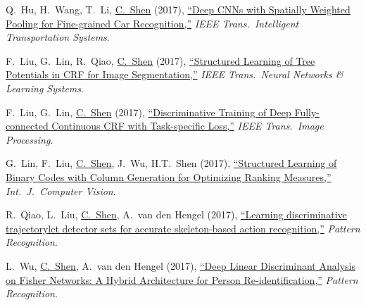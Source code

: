 \documentclass[9pt, a4paper]{article}
\newcommand{\years}[1]{\marginnote{\scriptsize #1}}
\def\highlight{\uline}
\begin{document}
\medskip

\years{2017} Q.~Hu, H.~Wang, T.~Li, \highlight{C.~Shen} (2017),
\href{http://www.google.com/search?lr=&ie=UTF-8&oe=UTF-8&q=Deep+CNNs+with+Spatially+Weighted+Pooling+for+Fine-grained+Car+Recognition+Qichang+Hu%2C+Huibing+Wang%2C+Teng+Li%2C+Chunhua+Shen}{``Deep {CNNs} with Spatially Weighted Pooling for Fine-grained Car Recognition,{}''}
\emph{IEEE Trans.\  Intelligent Transportation Systems}.

\medskip

\years{2017} F.~Liu, G.~Lin, R.~Qiao, \highlight{C.~Shen} (2017),
\href{http://www.google.com/search?lr=&ie=UTF-8&oe=UTF-8&q=Structured+Learning+of+Tree+Potentials+in+CRF+for+Image+Segmentation+Fayao+Liu%2C+Guosheng+Lin%2C+Ruizhi+Qiao%2C+Chunhua+Shen}{``Structured Learning of Tree Potentials in {CRF} for Image Segmentation,{}''}
\emph{IEEE Trans.\  Neural Networks \& Learning Systems}.

\medskip

\years{2017} F.~Liu, G.~Lin, \highlight{C.~Shen} (2017),
\href{http://www.google.com/search?lr=&ie=UTF-8&oe=UTF-8&q=Discriminative+Training+of+Deep+Fully-connected+Continuous+CRF+with+Task-specific+Loss+Fayao+Liu%2C+Guosheng+Lin%2C+Chunhua+Shen}{``Discriminative Training of Deep Fully-connected Continuous {CRF} with Task-specific Loss,{}''}
\emph{IEEE Trans.\  Image Processing}.

\medskip

\years{2017} G.~Lin, F.~Liu, \highlight{C.~Shen}, J.~Wu, H.T.~Shen (2017),
\href{http://www.google.com/search?lr=&ie=UTF-8&oe=UTF-8&q=Structured+Learning+of+Binary+Codes+with+Column+Generation+for+Optimizing+Ranking+Measures+Guosheng+Lin%2C+Fayao+Liu%2C+Chunhua+Shen%2C+Jianxin+Wu%2C+Heng+Tao+Shen}{``Structured Learning of Binary Codes with Column Generation for Optimizing Ranking Measures,{}''}
\emph{Int.\ J.\  Computer Vision}.

\medskip

\years{2017} R.~Qiao, L.~Liu, \highlight{C.~Shen}, A.~van den Hengel (2017),
\href{http://www.google.com/search?lr=&ie=UTF-8&oe=UTF-8&q=Learning+discriminative+trajectorylet+detector+sets+for+accurate+skeleton-based+action+recognition+Ruizhi+Qiao%2C+Lingqiao+Liu%2C+Chunhua+Shen%2C+Anton+van+den+Hengel}{``Learning discriminative trajectorylet detector sets for accurate skeleton-based action recognition,{}''}
\emph{Pattern Recognition}.

\medskip

\years{2017} L.~Wu, \highlight{C.~Shen}, A.~van den Hengel (2017),
\href{http://www.google.com/search?lr=&ie=UTF-8&oe=UTF-8&q=Deep+Linear+Discriminant+Analysis+on+Fisher+Networks%3A+A+Hybrid+Architecture+for+Person+Re-identification+Lin+Wu%2C+Chunhua+Shen%2C+Anton+van+den+Hengel}{``Deep Linear Discriminant Analysis on {F}isher Networks: A Hybrid Architecture for Person Re-identification,{}''}
\emph{Pattern Recognition}.
\end{document}
